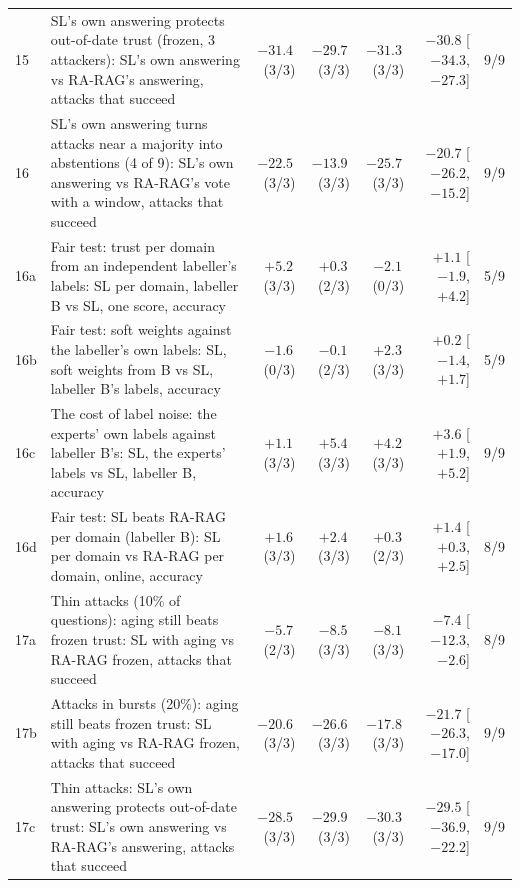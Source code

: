 \begin{landscape}
\begin{table}
\begin{tabular}{@{}l p{12.4cm} rrr r c@{}}
15 & SL's own answering protects out-of-date trust (frozen, 3 attackers): SL's own answering vs RA-RAG's answering, attacks that succeed & $-31.4$\,{\scriptsize(3/3)} & $-29.7$\,{\scriptsize(3/3)} & $-31.3$\,{\scriptsize(3/3)} & $-30.8$ [$-34.3$, $-27.3$] & 9/9 \\
16 & SL's own answering turns attacks near a majority into abstentions (4 of 9): SL's own answering vs RA-RAG's vote with a window, attacks that succeed & $-22.5$\,{\scriptsize(3/3)} & $-13.9$\,{\scriptsize(3/3)} & $-25.7$\,{\scriptsize(3/3)} & $-20.7$ [$-26.2$, $-15.2$] & 9/9 \\
16a & Fair test: trust per domain from an independent labeller's labels: SL per domain, labeller B vs SL, one score, accuracy & $+5.2$\,{\scriptsize(3/3)} & $+0.3$\,{\scriptsize(2/3)} & $-2.1$\,{\scriptsize(0/3)} & $+1.1$ [$-1.9$, $+4.2$] & 5/9 \\
16b & Fair test: soft weights against the labeller's own labels: SL, soft weights from B vs SL, labeller B's labels, accuracy & $-1.6$\,{\scriptsize(0/3)} & $-0.1$\,{\scriptsize(2/3)} & $+2.3$\,{\scriptsize(3/3)} & $+0.2$ [$-1.4$, $+1.7$] & 5/9 \\
16c & The cost of label noise: the experts' own labels against labeller B's: SL, the experts' labels vs SL, labeller B, accuracy & $+1.1$\,{\scriptsize(3/3)} & $+5.4$\,{\scriptsize(3/3)} & $+4.2$\,{\scriptsize(3/3)} & $+3.6$ [$+1.9$, $+5.2$] & 9/9 \\
16d & Fair test: SL beats RA-RAG per domain (labeller B): SL per domain vs RA-RAG per domain, online, accuracy & $+1.6$\,{\scriptsize(3/3)} & $+2.4$\,{\scriptsize(3/3)} & $+0.3$\,{\scriptsize(2/3)} & $+1.4$ [$+0.3$, $+2.5$] & 8/9 \\
17a & Thin attacks (10\% of questions): aging still beats frozen trust: SL with aging vs RA-RAG frozen, attacks that succeed & $-5.7$\,{\scriptsize(2/3)} & $-8.5$\,{\scriptsize(3/3)} & $-8.1$\,{\scriptsize(3/3)} & $-7.4$ [$-12.3$, $-2.6$] & 8/9 \\
17b & Attacks in bursts (20\%): aging still beats frozen trust: SL with aging vs RA-RAG frozen, attacks that succeed & $-20.6$\,{\scriptsize(3/3)} & $-26.6$\,{\scriptsize(3/3)} & $-17.8$\,{\scriptsize(3/3)} & $-21.7$ [$-26.3$, $-17.0$] & 9/9 \\
17c & Thin attacks: SL's own answering protects out-of-date trust: SL's own answering vs RA-RAG's answering, attacks that succeed & $-28.5$\,{\scriptsize(3/3)} & $-29.9$\,{\scriptsize(3/3)} & $-30.3$\,{\scriptsize(3/3)} & $-29.5$ [$-36.9$, $-22.2$] & 9/9 \\

\end{tabular}
\end{table}
\end{landscape}
